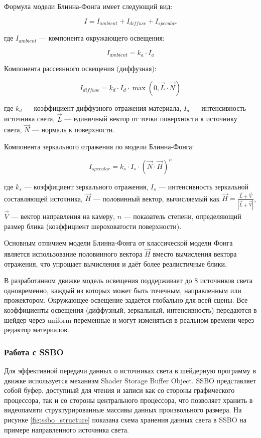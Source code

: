 Формула модели Блинна-Фонга имеет следующий вид:

$$
I = I_{ambient} + I_{diffuse} + I_{specular}
$$

где $I_{ambient}$ — компонента окружающего освещения:

$$
I_{ambient} = k_a \cdot I_a
$$

Компонента рассеянного освещения (диффузная):

$$
I_{diffuse} = k_d \cdot I_d \cdot \max(0, \vec{L} \cdot \vec{N})
$$

где $k_d$ — коэффициент диффузного отражения материала, $I_d$ — интенсивность источника света, $\vec{L}$ — единичный вектор от точки поверхности к источнику света, $\vec{N}$ — нормаль к поверхности.

Компонента зеркального отражения по модели Блинна-Фонга:

$$
I_{specular} = k_s \cdot I_s \cdot (\vec{N} \cdot \vec{H})^{n}
$$

где $k_s$ — коэффициент зеркального отражения, $I_s$ — интенсивность зеркальной составляющей источника, $\vec{H}$ — половинный вектор, вычисляемый как $\vec{H} = \frac{\vec{L} + \vec{V}}{|\vec{L} + \vec{V}|}$, $\vec{V}$ — вектор направления на камеру, $n$ — показатель степени, определяющий размер блика (коэффициент шероховатости поверхности).

Основным отличием модели Блинна-Фонга от классической модели Фонга является использование половинного вектора $\vec{H}$ вместо вычисления вектора отражения, что упрощает вычисления и даёт более реалистичные блики.

В разработанном движке модель освещения поддерживает до 8 источников света одновременно, каждый из которых может быть точечным, направленным или прожектором. Окружающее освещение задаётся глобально для всей сцены. Все коэффициенты освещения (диффузный, зеркальный, интенсивность) передаются в шейдер через uniform-переменные и могут изменяться в реальном времени через редактор материалов.

\subsubsection{Работа с SSBO}
Для эффективной передачи данных о источниках света в шейдерную программу в движке используется механизм Shader Storage Buffer Object. SSBO представляет собой буфер, доступный для чтения и записи как со стороны графического процессора, так и со стороны центрального процессора, что позволяет хранить в видеопамяти структурированные массивы данных произвольного размера. На рисунке \ref{fig:ssbo_structure} показана схема хранения данных света в SSBO на примере направленного источника света.

